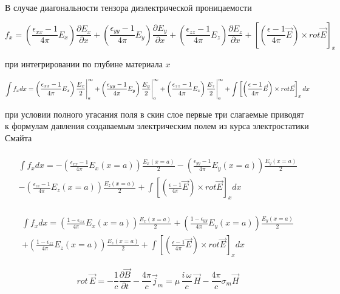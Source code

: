 \documentclass[11pt]{article}
\begin{document}
    В случае диагональности тензора диэлектрической проницаемости

\[
f_x
= \left(\frac{\epsilon_{xx} - 1}{4 \pi}E_x\right) \frac{\partial E_x}{\partial x}
+ \left(\frac{\epsilon_{yy} - 1}{4 \pi}E_y\right) \frac{\partial E_y}{\partial x}
+ \left(\frac{\epsilon_{zz} - 1}{4 \pi}E_z\right) \frac{\partial E_z}{\partial x}
+ \left[\left(\frac{\epsilon - 1}{4 \pi}\vec{E}\right) \times rot \vec{E}\right]_x
\]

при интегрировании по глубине материала \(x\)

    \[
\int f_x dx
= \left(\frac{\epsilon_{xx} - 1}{4 \pi}E_x\right) \frac{ E_x}{2} \Bigg|_{a}^{\infty} \\
+ \left(\frac{\epsilon_{yy} - 1}{4 \pi}E_y\right) \frac{ E_y}{2} \Bigg|_{a}^{\infty} \\
+ \left(\frac{\epsilon_{zz} - 1}{4 \pi}E_z\right) \frac{ E_z}{2} \Bigg|_{a}^{\infty} \\
+ \int \left[\left(\frac{\epsilon - 1}{4 \pi}\vec{E}\right) \times rot \vec{E}\right]_x dx
\]

при условии полного угасания поля в скин слое первые три слагаемые
приводят к формулам давления создаваемым электрическим полем из курса
электростатики Смайта

    \[\begin{array}{c} \\
\int f_x dx =
- \left(\frac{\epsilon_{xx} - 1}{4 \pi}E_x(x=a)\right) \frac{ E_x(x=a)}{2}
- \left(\frac{\epsilon_{yy} - 1}{4 \pi}E_y(x=a)\right) \frac{ E_y(x=a)}{2} \\
- \left(\frac{\epsilon_{zz} - 1}{4 \pi}E_z(x=a)\right) \frac{ E_z(x=a)}{2}
+ \int \left[\left(\frac{\epsilon - 1}{4 \pi}\vec{E}\right) \times rot \vec{E}\right]_x dx
\end{array}\]

    \[\begin{array}{c} \\
\int f_x dx
= \left(\frac{1 - \epsilon_{xx}}{4 \pi}E_x(x=a)\right) \frac{ E_x(x=a)}{2}
+ \left(\frac{1 - \epsilon_{yy}}{4 \pi}E_y(x=a)\right) \frac{ E_y(x=a)}{2} \\
+ \left(\frac{1 - \epsilon_{zz}}{4 \pi}E_z(x=a)\right) \frac{ E_z(x=a)}{2}
+ \int \left[\left(\frac{\epsilon - 1}{4 \pi}\vec{E}\right) \times rot \vec{E}\right]_x dx
\end{array}\]

    \[rot\,\vec{E} = -\frac{1}{c}\frac{\partial \vec B}{\partial t} - \frac{4\pi}{c}\vec j_m = \mu\,\frac{i\,\omega}{c}\,\vec{H} - \frac{4\pi}{c}\sigma_m \vec H \]
\end{document}
